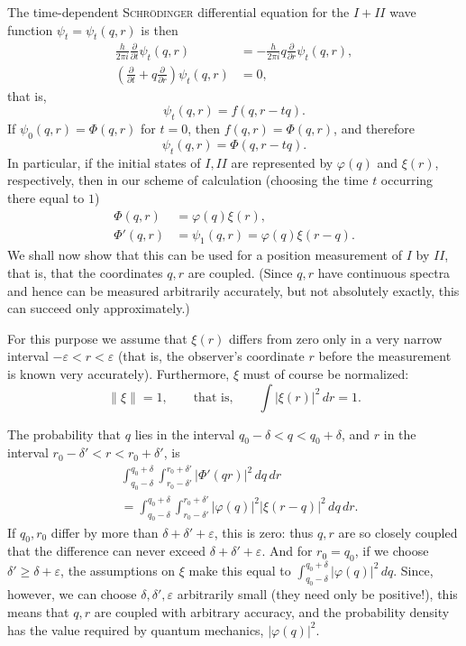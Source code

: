 \documentclass[fontsize=13pt,twoside,openany,headings=normal,parskip=false,bookmarkpackage=false,DIV=calc]{scrbook}
\begin{document}
The time-dependent \textsc{Schrödinger} differential equation for the $I+II$ wave function $\psi_t=\psi_t(q,r)$ is then
\begin{align*}
 \frac{h}{2\pi i}\frac{\partial}{\partial t}\psi_t(q,r)
 &=-\frac{h}{2\pi i}q\frac{\partial}{\partial r}\psi_t(q,r),\\
 \left(\frac{\partial}{\partial t}+q\frac{\partial}{\partial r}\right)\psi_t(q,r)&=0,
\end{align*}
that is,
\[
 \psi_t(q,r)=f(q,r-tq).
\]
If $\psi_0(q,r)=\Phi(q,r)$ for $t=0$, then $f(q,r)=\Phi(q,r)$, and therefore
\[
 \psi_t(q,r)=\Phi(q,r-tq).
\]
In particular, if the initial states of $I,II$ are represented by $\varphi(q)$ and $\xi(r)$, respectively, then in our scheme of calculation (choosing the time $t$ occurring there equal to $1$)
\begin{align*}
 \Phi(q,r)&=\varphi(q)\xi(r),\\
 \Phi'(q,r)&=\psi_1(q,r)=\varphi(q)\xi(r-q).
\end{align*}
We shall now show that this can be used for a position measurement of $I$ by $II$, that is, that the coordinates $q,r$ are coupled. (Since $q,r$ have continuous spectra and hence can be measured arbitrarily accurately, but not absolutely exactly, this can succeed only approximately.)

For this purpose we assume that $\xi(r)$ differs from zero only in a very narrow interval $-\varepsilon<r<\varepsilon$ (that is, the observer's coordinate $r$ before the measurement is known very accurately). Furthermore, $\xi$ must of course be normalized:
\[
 \|\xi\|=1,\qquad\text{that is,}\qquad\int|\xi(r)|^2\,dr=1.
\]
\hypertarget{origpage-237}{}%

The probability that $q$ lies in the interval $q_0-\delta<q<q_0+\delta$, and $r$ in the interval $r_0-\delta'<r<r_0+\delta'$, is
\begin{align*}
 &\int_{q_0-\delta}^{q_0+\delta}\int_{r_0-\delta'}^{r_0+\delta'}
 |\Phi'(qr)|^2\,dq\,dr\\
 &=\int_{q_0-\delta}^{q_0+\delta}\int_{r_0-\delta'}^{r_0+\delta'}
 |\varphi(q)|^2|\xi(r-q)|^2\,dq\,dr.
\end{align*}
If $q_0,r_0$ differ by more than $\delta+\delta'+\varepsilon$, this is zero: thus $q,r$ are so closely coupled that the difference can never exceed $\delta+\delta'+\varepsilon$. And for $r_0=q_0$, if we choose $\delta'\geq\delta+\varepsilon$, the assumptions on $\xi$ make this equal to $\int_{q_0-\delta}^{q_0+\delta}|\varphi(q)|^2\,dq$. Since, however, we can choose $\delta,\delta',\varepsilon$ arbitrarily small (they need only be positive!), this means that $q,r$ are coupled with arbitrary accuracy, and the probability density has the value required by quantum mechanics, $|\varphi(q)|^2$.
\end{document}
